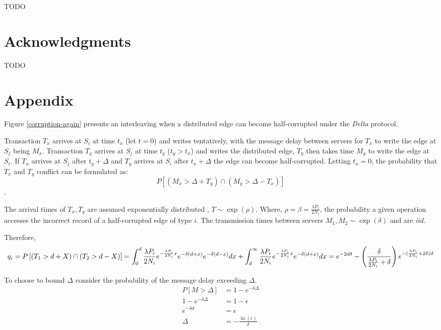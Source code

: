 \documentclass[sigplan,10pt]{acmart}
\begin{document}
TODO

\section{Acknowledgments}

TODO


\appendix
\section{Appendix}

Figure \ref{corruption-again} presents an interleaving when a distributed edge can become half-corrupted under the \emph{Delta} protocol.

Transaction $T_x$ arrives at $S_i$ at time $t_x$ (let $t=0$) and writes tentatively, with the message delay between servers for $T_x$ to write the edge at $S_j$ being $M_x$. Transaction $T_y$ arrives at $S_j$ at time $t_y$ ($t_y > t_x$) and writes the distributed edge, $T_y$ then takes time $M_y$ to write the edge at $S_i$. If $T_x$ arrives at $S_j$ after $t_y + \Delta$ and $T_y$ arrives at $S_i$ after $t_x + \Delta$ the edge can become half-corrupted. Letting $t_x = 0 $, the probability that $T_x$ and $T_y$ conflict can be formulated as: $$ P \left[ ( M_x >  \Delta + T_y) \cap (M_y > \Delta - T_x) \right]$$.

The arrival times of $T_x,T_y$ are assumed exponentially distributed , $T \sim \exp (\rho)$. Where, $ \rho = \beta = \frac{\lambda P_i}{2N_i}$, the probability a given operation accesses the incorrect record of a half-corrupted edge of type $i$. The transmission times between servers $M_1, M_2 \sim \exp (\delta)$ and are \emph{iid}.


Therefore,
\begin{dmath*}
  q_{i} =  {P \left[ ( T_1 >  d + X) \cap (T_2 > d-X)  \right]} \\
  =  \int_{0}^{d}  \frac{\lambda P_i}{2 N_i} e^{-\frac{\lambda P_i}{2 N_i} x} e^{-\delta (d+x)} e^{-\delta (d-x)} dx + \int_{d}^{\infty} \frac{\lambda P_i}{2 N_i} e^{-\frac{\lambda P_i}{2 N_i} x} e^{-\delta (d+x)} dx  \\
  =  e^{-2 d \delta} - \left( \frac{\delta}{\frac{\lambda P_i}{2 N_i} + \delta} \right) e^{-(\frac{\lambda P_i}{2 N_i}+ 2\delta)d} \\
\end{dmath*}

To choose to bound $\Delta$ consider the probability of the message delay exceeding  $\Delta$.
\begin{align*}
  P \left[ M > \Delta \right] & = 1 - e^{- \delta \Delta} \\
  1 - e^{- \delta \Delta} & = 1 - \epsilon \\
  e^{- \delta d} & = \epsilon  \\
  \Delta & = - \frac{\ln(\epsilon)}{\delta}
\end{align*}
\end{document}
